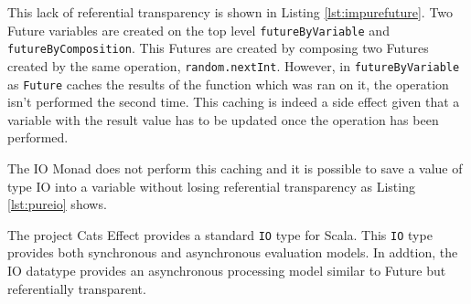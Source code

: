 \documentclass[../main.tex]{subfiles}
\begin{document}


This lack of referential transparency is shown in Listing \ref{lst:impurefuture}. Two
Future variables are created on the top level \texttt{futureByVariable} and
\texttt{futureByComposition}. This Futures are created by composing two Futures
created by the same operation, \texttt{random.nextInt}. However, in
\texttt{futureByVariable} as \texttt{Future} caches the results of the function
which was ran on it, the operation isn't performed the second time. This caching
is indeed a side effect given that a variable with the result value has to
be updated once the operation has been performed.

The IO Monad does not perform this caching and it is possible to save a value of type IO into a
variable without losing referential transparency as Listing \ref{lst:pureio} shows.

The project Cats Effect \autocite{CatsHome} provides a standard \texttt{IO} type for
Scala. This \texttt{IO} type provides both synchronous and asynchronous evaluation
models. In addtion, the IO datatype provides an asynchronous processing model similar to
Future but referentially transparent.


\end{document}
